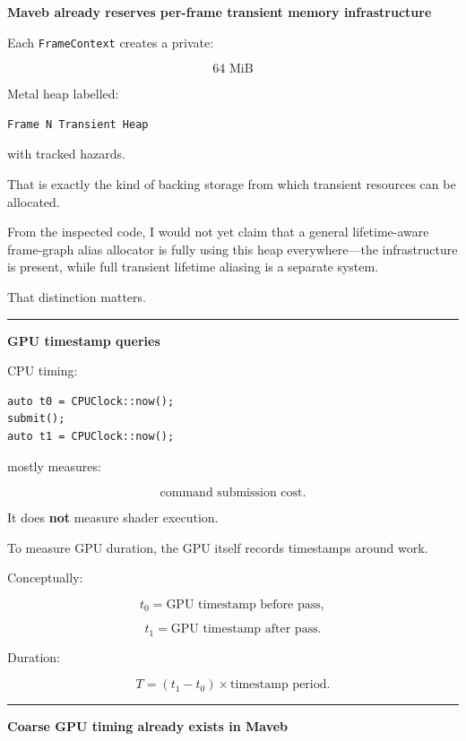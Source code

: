 \textbf{Maveb already reserves per-frame transient memory infrastructure}

Each \texttt{FrameContext} creates a private:

\[
64\text{ MiB}
\]

Metal heap labelled:

\protect{}\label{p10-transient}%
\begin{verbatim}
Frame N Transient Heap
\end{verbatim}

with tracked hazards.

That is exactly the kind of backing storage from which transient resources can be allocated.

From the inspected code, I would not yet claim that a general lifetime-aware frame-graph alias allocator is fully using this heap everywhere---the infrastructure is present, while full transient lifetime aliasing is a separate system.

That distinction matters.

\begin{center}\rule{0.5\linewidth}{0.5pt}\end{center}

\textbf{GPU timestamp queries}

CPU timing:

\protect{}\label{p10-wrong-gpu-time}%
\begin{verbatim}
auto t0 = CPUClock::now();
submit();
auto t1 = CPUClock::now();
\end{verbatim}

mostly measures:

\[
\text{command submission cost}.
\]

It does \textbf{not} measure shader execution.

To measure GPU duration, the GPU itself records timestamps around work.

Conceptually:

\[
t_0=\text{GPU timestamp before pass},
\]

\[
t_1=\text{GPU timestamp after pass}.
\]

Duration:

\[
\boxed{
T=
(t_1-t_0)\times
\text{timestamp period}.
}
\]

\begin{center}\rule{0.5\linewidth}{0.5pt}\end{center}

\textbf{Coarse GPU timing already exists in Maveb}


